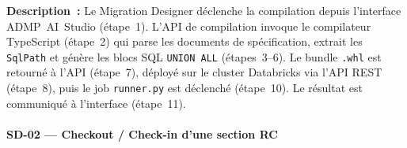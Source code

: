 \noindent\textbf{Description~:} Le Migration Designer déclenche la compilation depuis l'interface ADMP~AI~Studio (étape~1). L'API de compilation invoque le compilateur TypeScript (étape~2) qui parse les documents de spécification, extrait les \texttt{SqlPath} et génère les blocs SQL \texttt{UNION ALL} (étapes~3--6). Le bundle \texttt{.whl} est retourné à l'API (étape~7), déployé sur le cluster Databricks via l'API REST (étape~8), puis le job \texttt{runner.py} est déclenché (étape~10). Le résultat est communiqué à l'interface (étape~11).

\paragraph{SD-02 --- Checkout / Check-in d'une section RC}

